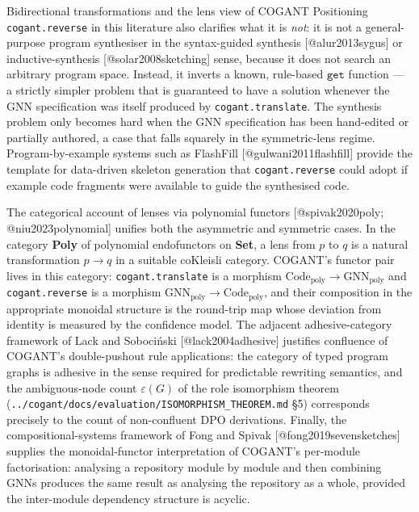 \documentclass[
  ignorenonframetext,
]{beamer}
\begin{document}
\begin{frame}[fragile]{Bidirectional transformations and the lens view
of COGANT}
Positioning \texttt{cogant.reverse} in this literature also clarifies
what it is \emph{not}: it is not a general-purpose program synthesiser
in the syntax-guided synthesis {[}@alur2013sygus{]} or
inductive-synthesis {[}@solar2008sketching{]} sense, because it does not
search an arbitrary program space. Instead, it inverts a known,
rule-based \(\texttt{get}\) function --- a strictly simpler problem that
is guaranteed to have a solution whenever the GNN specification was
itself produced by \texttt{cogant.translate}. The synthesis problem only
becomes hard when the GNN specification has been hand-edited or
partially authored, a case that falls squarely in the symmetric-lens
regime. Program-by-example systems such as FlashFill
{[}@gulwani2011flashfill{]} provide the template for data-driven
skeleton generation that \texttt{cogant.reverse} could adopt if example
code fragments were available to guide the synthesised code.

The categorical account of lenses via polynomial functors
{[}@spivak2020poly; @niu2023polynomial{]} unifies both the asymmetric
and symmetric cases. In the category \textbf{Poly} of polynomial
endofunctors on \textbf{Set}, a lens from \(p\) to \(q\) is a natural
transformation \(p \to q\) in a suitable coKleisli category. COGANT's
functor pair lives in this category: \texttt{cogant.translate} is a
morphism \(\text{Code}_{\text{poly}} \to \text{GNN}_{\text{poly}}\) and
\texttt{cogant.reverse} is a morphism
\(\text{GNN}_{\text{poly}} \to \text{Code}_{\text{poly}}\), and their
composition in the appropriate monoidal structure is the round-trip map
whose deviation from identity is measured by the confidence model. The
adjacent adhesive-category framework of Lack and Sobociński
{[}@lack2004adhesive{]} justifies confluence of COGANT's double-pushout
rule applications: the category of typed program graphs is adhesive in
the sense required for predictable rewriting semantics, and the
ambiguous-node count \(\varepsilon(G)\) of the role isomorphism theorem
(\texttt{../cogant/docs/evaluation/ISOMORPHISM\_THEOREM.md} §5)
corresponds precisely to the count of non-confluent DPO derivations.
Finally, the compositional-systems framework of Fong and Spivak
{[}@fong2019sevensketches{]} supplies the monoidal-functor
interpretation of COGANT's per-module factorisation: analysing a
repository module by module and then combining GNNs produces the same
result as analysing the repository as a whole, provided the inter-module
dependency structure is acyclic.
\end{frame}
\end{document}
